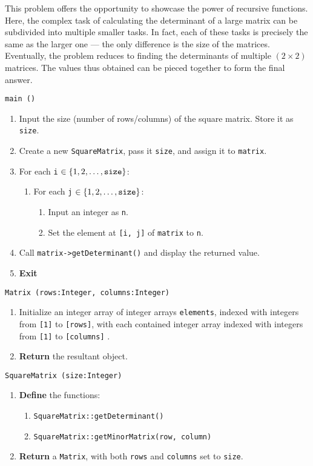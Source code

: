 \solution This problem offers the opportunity to showcase the power of recursive functions. Here, the complex
task of calculating the determinant of a large matrix can be subdivided into multiple smaller tasks. In fact,
each of these tasks is precisely the same as the larger one --- the only difference is the size of the matrices.
Eventually, the problem reduces to finding the determinants of multiple $(2 \times 2)$ matrices. The values thus
obtained can be pieced together to form the final answer.

\algorithm
{\tt main ()}
\begin{enumerate}
	\item	Input the size (number of rows/columns) of the square matrix.
			Store it as {\tt size}.
	\item	Create a new {\tt SquareMatrix}, pass it {\tt size}, and assign
			it to {\tt matrix}.
	\item	For each {\tt i} $\in \{1, 2, \dots, \text{\tt size}\}$:
	\begin{enumerate}
		\item	For each {\tt j} $\in \{1, 2, \dots, \text{\tt size}\}$:
		\begin{enumerate}
			\item	Input an integer as {\tt n}.
			\item	Set the element at {\tt [i, j]} of {\tt matrix} to {\tt n}.
		\end{enumerate}
	\end{enumerate}
	\item	Call {\tt matrix->getDeterminant()} and display the returned value.
	\item	{\bf Exit}
\end{enumerate}
\vspace{8mm}
{\tt Matrix (rows:Integer, columns:Integer)}
\begin{enumerate}
	\item	Initialize an integer array of integer arrays {\tt elements}, indexed with integers from {\tt [1]} to 
			{\tt [rows]}, with each contained integer array indexed with integers from {\tt [1]} to
			{\tt [columns]} .
	\item	{\bf Return} the resultant object.
\end{enumerate}
\vspace{5mm}
{\tt SquareMatrix (size:Integer)}
\begin{enumerate}
	\item	{\bf Define} the functions: 
	\begin{enumerate}
		\item	{\tt SquareMatrix::getDeterminant()}
		\item	{\tt SquareMatrix::getMinorMatrix(row, column)}
	\end{enumerate}
	\item	{\bf Return} a {\tt Matrix}, with both {\tt rows} and {\tt columns} set to {\tt size}.
\end{enumerate}
